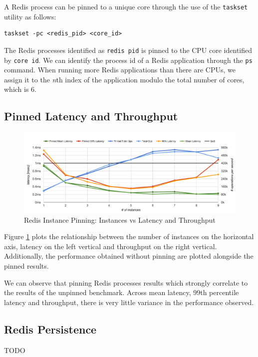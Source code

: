 A Redis process can be pinned to a unique core through the use of the \texttt{taskset} utility as follows:

\begin{lstlisting}
taskset -pc <redis_pid> <core_id>
\end{lstlisting}

The Redis processes identified as \texttt{redis pid} is pinned to the CPU core identified by \texttt{core id}. We can identify the process id of a Redis application through the \texttt{ps} command. When running more Redis applications than there are CPUs, we assign it to the \textit{n}th index of the application modulo the total number of cores, which is 6.


\subsection{Pinned Latency and Throughput}

\begin{figure}[h]
    \includegraphics[width=\textwidth]{./res/6_pinned.png}
    \caption{Redis Instance Pinning: Instances vs Latency and Throughput}
    \label{fig:6_pinned.png}
\end{figure}

Figure \ref{fig:6_pinned.png} plots the relationship between the number of instances on the horizontal axis, latency on the left vertical and throughput on the right vertical. Additionally, the performance obtained without pinning are plotted alongside the pinned results.

We can observe that pinning  Redis processes results which strongly correlate to the results of the unpinned benchmark. Across mean latency, 99th percentile latency and throughput, there is very little variance in the performance observed.


\subsection{Redis Persistence}
TODO


